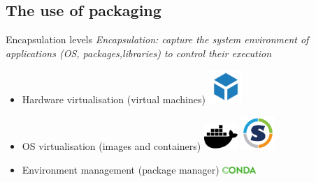 \subsection{The use of packaging}
\begin{frame}{Encapsulation levels}
\emph{Encapsulation: capture the system environment of applications (OS, packages,libraries) to control their execution}
\begin{itemize}
	\item Hardware virtualisation (virtual machines) \includegraphics[width=0.1\textwidth]{images/VM_logo.png} 
	\item OS virtualisation (images and containers) \includegraphics[width=0.1\textwidth]{images/docker.pdf} \includegraphics[width=0.1\textwidth]{images/singularity_logo.pdf} 
	\item Environment management (package manager) \includegraphics[width=0.1\textwidth]{images/conda_logo.pdf} 
\end{itemize}
\end{frame}

